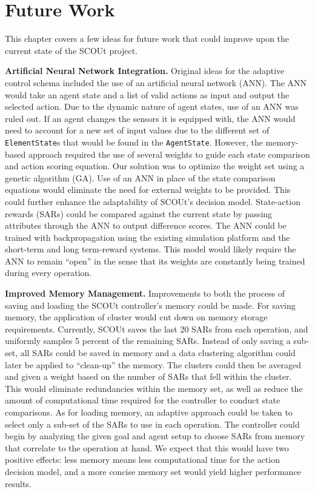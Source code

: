

\chapter{Future Work} \label{ch:future_work}
This chapter covers a few ideas for future work that could improve upon the current state of the SCOUt project.

\noindent
\textbf{Artificial Neural Network Integration.}
Original ideas for the adaptive control schema included the use of an artificial neural network (ANN).
The ANN would take an agent state and a list of valid actions as input and output the selected action.
Due to the dynamic nature of agent states, use of an ANN was ruled out.
If an agent changes the sensors it is equipped with, the ANN would need to account for a new set of input values due to the different set of \texttt{ElementState}s that would be found in the \texttt{AgentState}.
However, the memory-based approach required the use of several weights to guide each state comparison and action scoring equation.
Our solution was to optimize the weight set using a genetic algorithm (GA).
Use of an ANN in place of the state comparison equations would eliminate the need for external weights to be provided.
This could further enhance the adaptability of SCOUt's decision model.
State-action rewards (SARs) could be compared against the current state by passing attributes through the ANN to output difference scores.
The ANN could be trained with backpropagation using the existing simulation platform and the short-term and long term-reward systems.
This model would likely require the ANN to remain ``open'' in the sense that its weights are constantly being trained during every operation.

\noindent
\textbf{Improved Memory Management.}
Improvements to both the process of saving and loading the SCOUt controller's memory could be made.
For saving memory, the application of cluster would cut down on memory storage requirements.
Currently, SCOUt saves the last 20 SARs from each operation, and uniformly samples 5 percent of the remaining SARs.
Instead of only saving a sub-set, all SARs could be saved in memory and a data clustering algorithm could later be applied to ``clean-up'' the memory.
The clusters could then be averaged and given a weight based on the number of SARs that fell within the cluster.
This would eliminate redundancies within the memory set, as well as reduce the amount of computational time required for the controller to conduct state comparisons.
As for loading memory, an adaptive approach could be taken to select only a sub-set of the SARs to use in each operation.
The controller could begin by analyzing the given goal and agent setup to choose SARs from memory that correlate to the operation at hand.
We expect that this would have two positive effects: less memory means less computational time for the action decision model, and a more concise memory set would yield higher performance results.

